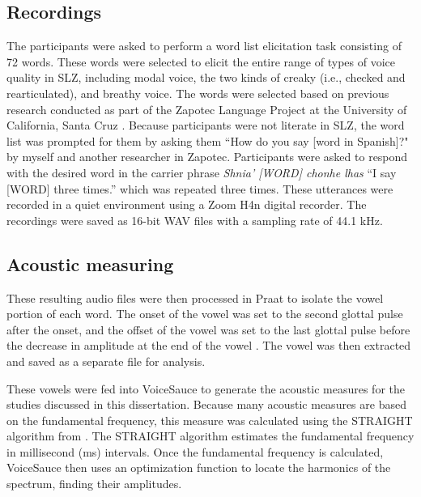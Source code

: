 \subsection{Recordings} \label{sec:acousticlandscape:recordings} 
The participants were asked to perform a word list elicitation task consisting of 72 words. These words were selected to elicit the entire range of types of voice quality in SLZ, including modal voice, the two kinds of creaky (i.e., checked and rearticulated), and breathy voice. The words were selected based on previous research conducted as part of the Zapotec Language Project at the University of California, Santa Cruz \citep{ZapotecLanguageProject}. 
Because participants were not literate in SLZ, the word list was prompted for them by asking them ``How do you say [word in Spanish]?" by myself and another researcher in Zapotec. Participants were asked to respond with the desired word in the carrier phrase \textit{Shnia' [WORD] chonhe lhas} ``I say [WORD] three times.'' which was repeated three times. These utterances were recorded in a quiet environment using a Zoom H4n digital recorder. The recordings were saved as 16-bit WAV files with a sampling rate of 44.1 kHz.

\subsection{Acoustic measuring} \label{sec:acousticlandscape:analysis}
These resulting audio files were then processed in Praat to isolate the vowel portion of each word. The onset of the vowel was set to the second glottal pulse after the onset, and the offset of the vowel was set to the last glottal pulse before the decrease in amplitude at the end of the vowel \citep{garellekAcousticDiscriminabilityComplex2020}. The vowel was then extracted and saved as a separate file for analysis.

These vowels were fed into VoiceSauce \citep{shueVoiceSauceProgramVoice2011} to generate the acoustic measures for the studies discussed in this dissertation. Because many acoustic measures are based on the fundamental frequency, this measure was calculated using the STRAIGHT algorithm from \citep{kawaharaInstantaneousfrequencybasedPitchExtraction1998}. The STRAIGHT algorithm estimates the fundamental frequency in millisecond (ms) intervals. Once the fundamental frequency is calculated, VoiceSauce then uses an optimization function to locate the harmonics of the spectrum, finding their amplitudes.

